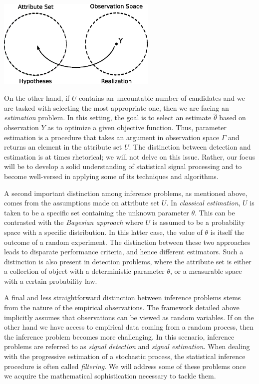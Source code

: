 \begin{center}
\includegraphics[width=3in]{Figures/1Chapter/DetectionModel}
\end{center}

On the other hand, if $U$ contains an uncountable number of candidates and we are tasked with selecting the most appropriate one, then we are facing an \emph{estimation} problem.
In this setting, the goal is to select an estimate $\hat{\theta}$ based on observation $Y$ as to optimize a given objective function.
Thus, parameter estimation is a procedure that takes an argument in observation space $\Gamma$ and returns an element in the attribute set $U$.
The distinction between detection and estimation is at times rhetorical;
we will not delve on this issue.
Rather, our focus will be to develop a solid understanding of statistical signal processing and to become well-versed in applying some of its techniques and algorithms.

A second important distinction among inference problems, as mentioned above, comes from the assumptions made on attribute set $U$.
In \emph{classical estimation}, $U$ is taken to be a specific set containing the unknown parameter $\theta$.
This can be contrasted with the \emph{Bayesian approach} where $U$ is assumed to be a probability space with a specific distribution.
In this latter case, the value of $\theta$ is itself the outcome of a random experiment.
The distinction between these two approaches leads to disparate performance criteria, and hence different estimators.
Such a distinction is also present in detection problems, where the attribute set is either a collection of object with a deterministic parameter $\theta$, or a measurable space with a certain probability law.

A final and less straightforward distinction between inference problems stems from the nature of the empirical observations.
The framework detailed above implicitly assumes that observations can be viewed as random variables.
If on the other hand we have access to empirical data coming from a random process, then the inference problem becomes more challenging.
In this scenario, inference problems are referred to as \emph{signal detection} and \emph{signal estimation}.
When dealing with the progressive estimation of a stochastic process, the statistical inference procedure is often called \emph{filtering}.
We will address some of these problems once we acquire the mathematical sophistication necessary to tackle them.


